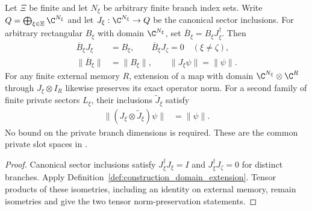 \begin{theorem}
    \label{thm:construction_private_sectors}
    \leanok
    Let $\Xi$ be finite and let $N_\xi$ be arbitrary finite branch
    index sets. Write $Q=\bigoplus_{\xi\in\Xi}\C^{N_\xi}$ and let
    $J_\xi:\C^{N_\xi}\to Q$ be the canonical sector inclusions.
    For arbitrary rectangular $B_\xi$ with domain $\C^{N_\xi}$, set
    $\overline B_\xi=B_\xi J_\xi^\dagger$. Then
    \begin{align}
        \overline B_\xi J_\xi       & =B_\xi,
        \qquad \overline B_\xi J_\zeta=0\quad(\xi\ne\zeta),
        \label{eq:construction_branch_recovery}            \\
        \lVert\overline B_\xi\rVert & =\lVert B_\xi\rVert,
        \qquad \lVert J_\xi\psi\rVert=\lVert\psi\rVert.
        \label{eq:construction_branch_norm}
    \end{align}
    For any finite external memory $R$, extension of a map with domain
    $\C^{N_\xi}\otimes\C^R$ through $J_\xi\otimes I_R$ likewise
    preserves its exact operator norm.
    For a second family of finite private sectors $L_\xi$, their
    inclusions $\widetilde J_\xi$ satisfy
    \begin{align}
        \lVert(J_\xi\otimes\widetilde J_\xi)\psi\rVert
         & =\lVert\psi\rVert.
        \label{eq:construction_bipartite_sector_norm}
    \end{align}
    No bound on the private branch dimensions is required.
    These are the common private slot spaces in
    \cite[Theorem~5.2]{OpenAI2026PolynomialPEPS}.
\end{theorem}

\begin{proof}\leanok
    Canonical sector inclusions satisfy $J_\xi^\dagger J_\xi=I$
    and $J_\xi^\dagger J_\zeta=0$ for distinct branches.
    Apply Definition~\ref{def:construction_domain_extension}.
    Tensor products of these isometries, including an identity on
    external memory, remain isometries and give the two tensor
    norm-preservation statements.
\end{proof}

